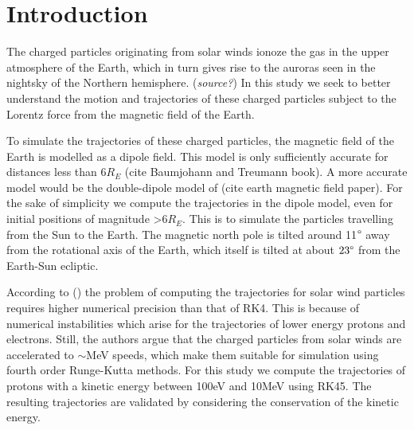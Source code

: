 \section{Introduction}
The charged particles originating from solar winds ionoze the gas in the upper atmosphere of the Earth, which in turn gives rise to the auroras seen in the nightsky of the Northern hemisphere. (\textit{source?}) 
In this study we seek to better understand the motion and trajectories of these charged particles subject to the Lorentz force from the magnetic field of the Earth. 

To simulate the trajectories of these charged particles, the magnetic field of the Earth is modelled  as a dipole field. 
This model is only sufficiently accurate for distances less than $6R_E$ (cite Baumjohann and Treumann book). 
A more accurate model would be the double-dipole model of (cite earth magnetic field paper).
For the sake of simplicity we compute the trajectories in the dipole model, even for initial positions of magnitude >$6R_E$. 
This is to simulate the particles travelling from the Sun to the Earth.
The magnetic north pole is tilted around 11$\degree$ away from the rotational axis of the Earth, which itself is tilted at about $23\degree$ from the Earth-Sun ecliptic.

According to (\cite{soni_2021}) the problem of computing the trajectories for solar wind particles requires higher numerical precision than that of RK4. 
This is because of numerical instabilities which arise for the trajectories of lower energy protons and electrons. 
Still, the authors argue that the charged particles from solar winds are accelerated to $\sim$MeV speeds, which make them suitable for simulation using fourth order Runge-Kutta methods. 
For this study we compute the trajectories of protons with a kinetic energy between 100eV and 10MeV  using RK45.
The resulting trajectories are validated by considering the conservation of the kinetic energy.